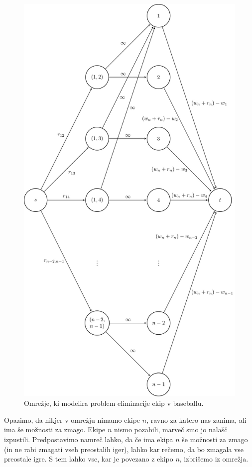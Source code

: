 \documentclass[mat1]{fmfdelo}
\begin{document}
\begin{figure}
  \centering
  \includegraphics[scale=.32]{images/baseball1/baseball1-1.jpg}
  \caption{Omrežje, ki modelira problem eliminacije ekip v baseballu.}
  \label{fig:baseball}
\end{figure}

Opazimo, da nikjer v omrežju nimamo ekipe $n$, ravno za katero nas zanima, ali ima še možnosti za zmago. Ekipe $n$ nismo pozabili, marveč smo jo nalašč izpustili. Predpostavimo
namreč lahko, da če ima ekipa $n$ še možnosti za zmago (in ne rabi zmagati vseh preostalih iger), lahko kar rečemo, da bo zmagala vse preostale igre. S tem lahko vse, kar je povezano z ekipo $n$, izbrišemo iz omrežja.\\
\end{document}

